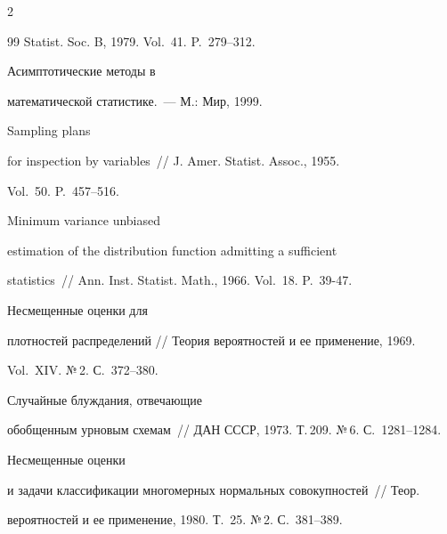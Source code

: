 \begin{multicols}{2}
{{\begin{thebibliography}{99}
Statist. Soc. B, 1979. Vol.~41. P.~279--312.








Асимптотические методы в


математической статистике.~--- М.: Мир, 1999. 











Sampling plans


for inspection by variables~// J. Amer. Statist. Assoc., 1955.


Vol.~50. P.~457--516.








Minimum variance unbiased


estimation of the distribution function admitting a sufficient


statistics~// Ann. Inst. Statist. Math., 1966. Vol.~18. P.~39-47.








Несмещенные оценки для


 плотностей распределений // Теория вероятностей и ее применение, 1969.


Vol.~XIV. №\,2. С.~372--380.








Случайные блуждания, отвечающие


обобщенным урновым схемам~// ДАН СССР, 1973. Т.\,209. №\,6. С.~1281--1284.









Несмещенные оценки


и задачи классификации многомерных нормальных совокупностей~// Теор.


вероятностей и ее применение, 1980. Т.~25. №\,2. С.~381--389.









\end{thebibliography}}}
\end{multicols}
